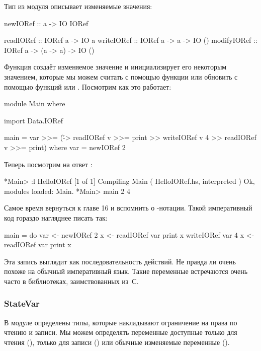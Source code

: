 Тип  из модуля  
описывает изменяемые значения:

\begin{code}
newIORef :: a -> IO IORef

readIORef   :: IORef a -> IO a
writeIORef  :: IORef a -> a -> IO ()
modifyIORef :: IORef a -> (a -> a) -> IO ()
\end{code}

Функция  создаёт изменяемое значение
и инициализирует его некоторым значением, которые
мы можем считать с помощью функции  
или обновить с помощью функций 
или . Посмотрим как это работает:

\begin{code}
module Main where

import Data.IORef

main = var >>= (\v -> 
       readIORef v >>= print 
    >> writeIORef v 4 
    >> readIORef v >>= print)
    where var = newIORef 2    
\end{code}

Теперь посмотрим на ответ :

\begin{code}
*Main> :l HelloIORef
[1 of 1] Compiling Main             ( HelloIORef.hs, interpreted )
Ok, modules loaded: Main.
*Main> main
2
4
\end{code}

Самое время вернуться к главе 16 и вспомнить о -нотации.
Такой императивный код гораздо нагляднее писать так:

\begin{code}
main = do
    var <- newIORef 2
    x <- readIORef var
    print x
    writeIORef var 4
    x <- readIORef var
    print x
\end{code}

Эта запись выглядит как последовательность действий. 
Не правда ли очень похоже на обычный императивный язык.
Такие переменные встречаются очень часто в библиотеках,
заимствованных из~С. 

\subsubsection{StateVar}

В модуле  определены типы, которые
накладывают ограничение на права по чтению и записи.
Мы можем определять переменные доступные 
только для чтения (), 
только для записи () или 
обычные изменяемые переменные ().


